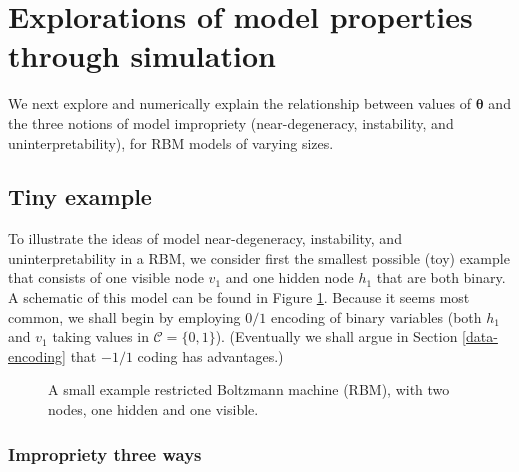 \documentclass[AMS,STIX1COL]{WileyNJD-v2}
\begin{document}
\hypertarget{explorations-of-model-properties-through-simulation}{%
\section{Explorations of model properties through
simulation}\label{explorations-of-model-properties-through-simulation}}

We next explore and numerically explain the relationship between values
of \(\boldsymbol \theta\) and the three notions of model impropriety
(near-degeneracy, instability, and uninterpretability), for RBM models
of varying sizes.

\hypertarget{tiny-example}{%
\subsection{Tiny example}\label{tiny-example}}

To illustrate the ideas of model near-degeneracy, instability, and
uninterpretability in a RBM, we consider first the smallest possible
(toy) example that consists of one visible node \(v_1\) and one hidden
node \(h_1\) that are both binary. A schematic of this model can be
found in Figure \ref{fig:toymodel}. Because it seems most common, we
shall begin by employing \(0/1\) encoding of binary variables (both
\(h_1\) and \(v_1\) taking values in \(\mathcal{C} = \{0,1\}\)).
(Eventually we shall argue in Section \ref{data-encoding} that \(-1/1\)
coding has advantages.)

\begin{figure}[ht]
  \centering
  \resizebox{1cm}{!}{}
  \caption{A small example restricted Boltzmann machine (RBM), with two nodes, one hidden and one visible.}
  \label{fig:toymodel}
\end{figure}

\hypertarget{impropriety-three-ways}{%
\subsubsection{Impropriety three ways}\label{impropriety-three-ways}}
\end{document}
